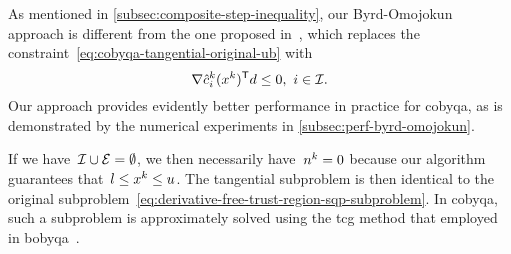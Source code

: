 As mentioned in \cref{subsec:composite-step-inequality}, our Byrd-Omojokun approach is different from the one proposed in~\cite[\S~15.4.4]{Conn_Gould_Toint_2000}, which replaces the constraint~\cref{eq:cobyqa-tangential-original-ub} with
\begin{equation*}
    \nabla \conm[k]{i}(\iter[k])^{\T} \step \le 0, ~ i \in \iub.
\end{equation*}
Our approach provides evidently better performance in practice for \gls{cobyqa}, as is demonstrated by the numerical experiments in \cref{subsec:perf-byrd-omojokun}.

If we have~$\mathcal{I} \cup \mathcal{E} = \emptyset$, we then necessarily have~$\nstep[k] = 0$ because our algorithm guarantees that~$\xl \le \iter[k] \le \xu$.
The tangential subproblem is then identical to the original subproblem~\cref{eq:derivative-free-trust-region-sqp-subproblem}.
In \gls{cobyqa}, such a subproblem is approximately solved using the \gls{tcg} method that \citeauthor{Powell_2009} employed in \gls{bobyqa}~\cite{Powell_2009}.

